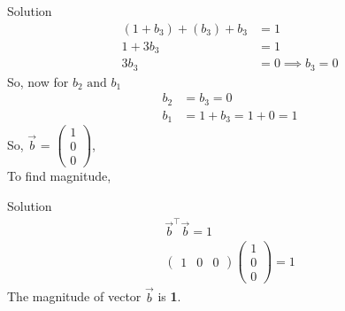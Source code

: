 \documentclass{beamer}
\newcommand{\myvec}[1]{\ensuremath{\begin{pmatrix}#1\end{pmatrix}}}
\providecommand{\brak}[1]{\ensuremath{\left(#1\right)}}
\begin{document}
\begin{frame}{Solution}
\begin{align}
	\brak{1 + b_3} + \brak{b_3} + b_3 &= 1 \\
	1 + 3b_3 &= 1 \\
	3b_3 &= 0 \implies b_3 = 0
\end{align}
So, now for $b_2 \text{ and } b_1$
\begin{align}
	b_2 &= b_3 = 0 \\
	b_1 &= 1 + b_3 = 1 + 0 = 1
\end{align}
So,  $\vec{b}$ = $\myvec{1 \\ 0 \\ 0}$,\\
To find magnitude,
\end{frame}
\begin{frame}{Solution}
\begin{align}
	\vec{b}^\top \vec{b} = 1 \\
	\myvec{ 1 & 0 & 0 } \myvec{1 \\ 0 \\ 0} = 1
\end{align}
The magnitude of vector $\vec{b}$ is \textbf{1}.
\end{frame}
\end{document}
